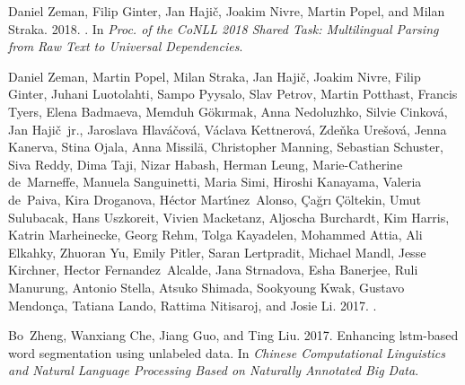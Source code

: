 \documentclass[11pt,a4paper]{article}
\begin{document}
\begin{thebibliography}{}
	Daniel Zeman, Filip Ginter, Jan Haji{\v{c}}, Joakim Nivre, Martin Popel, and
	Milan Straka. 2018.
	.
	\newblock In {\em {Proc. of the CoNLL 2018 Shared Task: Multilingual Parsing
			from Raw Text to Universal Dependencies}\/}.
	
	Daniel Zeman, Martin Popel, Milan Straka, Jan Haji{\v{c}}, Joakim Nivre, Filip
	Ginter, Juhani Luotolahti, Sampo Pyysalo, Slav Petrov, Martin Potthast,
	Francis Tyers, Elena Badmaeva, Memduh G{\"{o}}k{\i}rmak, Anna Nedoluzhko,
	Silvie Cinkov{\'{a}}, Jan Haji{\v{c}}~jr., Jaroslava
	Hlav{\'{a}}{\v{c}}ov{\'{a}}, V{\'{a}}clava Kettnerov{\'{a}}, Zde{\v{n}}ka
	Ure{\v{s}}ov{\'{a}}, Jenna Kanerva, Stina Ojala, Anna Missil{\"{a}},
	Christopher Manning, Sebastian Schuster, Siva Reddy, Dima Taji, Nizar Habash,
	Herman Leung, Marie-Catherine de~Marneffe, Manuela Sanguinetti, Maria Simi,
	Hiroshi Kanayama, Valeria de~Paiva, Kira Droganova, H{\'{e}}ctor
	Mart{\'{\i}}nez~Alonso, {\c{C}}a{\u{g}}r{\i} {\c{C}}{\"{o}}ltekin, Umut
	Sulubacak, Hans Uszkoreit, Vivien Macketanz, Aljoscha Burchardt, Kim Harris,
	Katrin Marheinecke, Georg Rehm, Tolga Kayadelen, Mohammed Attia, Ali Elkahky,
	Zhuoran Yu, Emily Pitler, Saran Lertpradit, Michael Mandl, Jesse Kirchner,
	Hector Fernandez~Alcalde, Jana Strnadova, Esha Banerjee, Ruli Manurung,
	Antonio Stella, Atsuko Shimada, Sookyoung Kwak, Gustavo Mendon{\c{c}}a,
	Tatiana Lando, Rattima Nitisaroj, and Josie Li. 2017.
	.
	
	Bo~Zheng, Wanxiang Che, Jiang Guo, and Ting Liu. 2017.
	\newblock Enhancing lstm-based word segmentation using unlabeled data.
	\newblock In {\em Chinese Computational Linguistics and Natural Language
		Processing Based on Naturally Annotated Big Data\/}.
	
\end{thebibliography}
\end{document}
